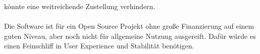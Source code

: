 \documentclass[12pt,a4paper]{article}
\begin{document}
könnte eine weitreichende Zustellung verhindern.\\
\\
Die Software ist für ein Open Source Projekt ohne große Finanzierung auf einem guten Niveau,
aber noch nicht für allgemeine Nutzung ausgereift. Dafür würde es einen Feinschliff in User Experience und Stabilität benötigen.\\
\end{document}
